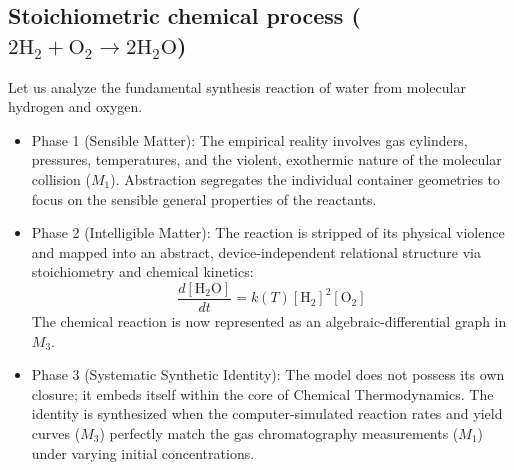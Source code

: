 \documentclass[11pt, a4paper]{article}
\begin{document}
\subsection{Stoichiometric chemical process ($2\text{H}_2 + \text{O}_2 \rightarrow 2\text{H}_2\text{O}$)}
Let us analyze the fundamental synthesis reaction of water from molecular hydrogen and oxygen.
\begin{itemize}
\item \textrm{Phase 1 (Sensible Matter):} The empirical reality involves gas cylinders, pressures, temperatures, and the violent, exothermic nature of the molecular collision ($M_1$). Abstraction segregates the individual container geometries to focus on the sensible general properties of the reactants.
\item \textrm{Phase 2 (Intelligible Matter):} The reaction is stripped of its physical violence and mapped into an abstract, device-independent relational structure via stoichiometry and chemical kinetics:
\begin{equation}
\frac{d[\text{H}_2\text{O}]}{dt} = k(T)[\text{H}_2]^2[\text{O}_2]
\end{equation}
The chemical reaction is now represented as an algebraic-differential graph in $M_3$.
\item \textrm{Phase 3 (Systematic Synthetic Identity):} The model does not possess its own closure; it embeds itself within the core of Chemical Thermodynamics. The identity is synthesized when the computer-simulated reaction rates and yield curves ($M_3$) perfectly match the gas chromatography measurements ($M_1$) under varying initial concentrations.
\end{itemize}
\end{document}
